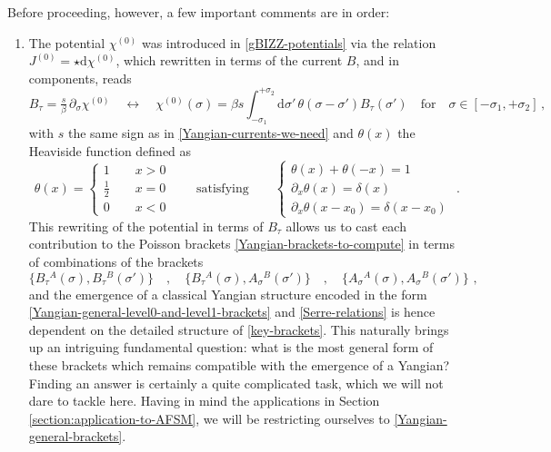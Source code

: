 \documentclass[12pt]{article}
\numberwithin{equation}{section}
\begin{document}
Before proceeding, however, a few important comments are in order:
\begin{enumerate}
\item The potential $\chi^{(0)}$ was introduced in \eqref{gBIZZ-potentials} via the relation $J^{(0)}=\star \mathrm{d}\chi^{(0)}$, which rewritten in terms of the current $B$, and in components, reads \cite{MacKay:1992he}
\begin{equation}\label{Yangian-B-chi0-relation}
\!\!B_{\tau}\!=\!\tfrac{s}{\beta}\,\partial_{\sigma}\chi^{(0)} \quad \longleftrightarrow \quad \chi^{(0)}\!(\sigma)\!=\!\beta s\!\!\int_{-\sigma_{1}}^{+\sigma_{2}}\!\!\!\!\!\!\!\!\!\!\mathrm{d}\sigma' \, \theta(\sigma\!-\!\sigma')B_{\tau}(\sigma')\quad \text{for} \quad \sigma\!\in\![-\sigma_{1},+\sigma_{2}] \, ,
\end{equation}
with $s$ the same sign as in \eqref{Yangian-currents-we-need} and $\theta(x)$ the Heaviside function defined as
\begin{equation}\label{Heaviside-definition}
\theta(x)=
\begin{cases}
1 \qquad x >0
\\
\tfrac{1}{2} \qquad x=0
\\
0 \qquad x<0
\end{cases}
\qquad \text{satisfying} \qquad
\begin{cases}
\theta(x)+\theta(-x)=1 
\\
\partial_{x}\theta(x)=\delta(x)
\\
\partial_{x}\theta(x-x_{0})=\delta(x-x_{0})
\end{cases}
\,\, .
\end{equation}
This rewriting of the potential in terms of $B_{\tau}$ allows us to cast each contribution to the Poisson brackets \eqref{Yangian-brackets-to-compute} in terms of combinations of the brackets 
\begin{equation}\label{key-brackets}
\{B_{\tau}{}^{A}(\sigma),B_{\tau}{}^{B}(\sigma')\} \quad, \quad \{B_{\tau}{}^{A}(\sigma),A_{\sigma}{}^{B}(\sigma')\} \quad , \quad \{A_{\sigma}{}^{A}(\sigma),A_{\sigma}{}^{B}(\sigma')\} \,\, ,
\end{equation}
and the emergence of a classical Yangian structure encoded in the form \eqref{Yangian-general-level0-and-level1-brackets} and \eqref{Serre-relations} is hence dependent on the detailed structure of \eqref{key-brackets}. This naturally brings up an intriguing fundamental question: what is the most general form of these brackets which remains compatible with the emergence of a Yangian? Finding an answer is certainly a quite complicated task, which we will not dare to tackle here. Having in mind the applications in Section \ref{section:application-to-AFSM}, we will be restricting ourselves to \eqref{Yangian-general-brackets}.

\end{enumerate}
\end{document}
